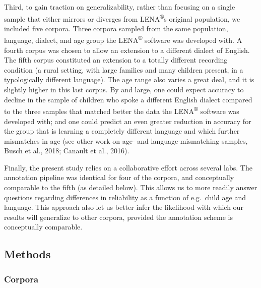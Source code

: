 \documentclass[english,table,man,floatsintext]{apa6}
\begin{document}
Third, to gain traction on generalizability, rather than focusing on a
single sample that either mirrors or diverges from
LENA\textsuperscript{®}s original population, we included five corpora.
Three corpora sampled from the same population, language, dialect, and
age group the LENA\textsuperscript{®} software was developed with. A
fourth corpus was chosen to allow an extension to a different dialect of
English. The fifth corpus constituted an extension to a totally
different recording condition (a rural setting, with large families and
many children present, in a typologically different language). The age
range also varies a great deal, and it is slightly higher in this last
corpus. By and large, one could expect accuracy to decline in the sample
of children who spoke a different English dialect compared to the three
samples that matched better the data the LENA\textsuperscript{®}
software was developed with; and one could predict an even greater
reduction in accuracy for the group that is learning a completely
different language and which further mismatches in age (see other work
on age- and language-mismatching samples, Busch et al., 2018; Canault et
al., 2016).

Finally, the present study relies on a collaborative effort across
several labs. The annotation pipeline was identical for four of the
corpora, and conceptually comparable to the fifth (as detailed below).
This allows us to more readily answer questions regarding differences in
reliability as a function of e.g.~child age and language. This approach
also let us better infer the likelihood with which our results will
generalize to other corpora, provided the annotation scheme is
conceptually comparable.

\subsection{Methods}\label{methods}

\subsubsection{Corpora}\label{corpora}
\end{document}
